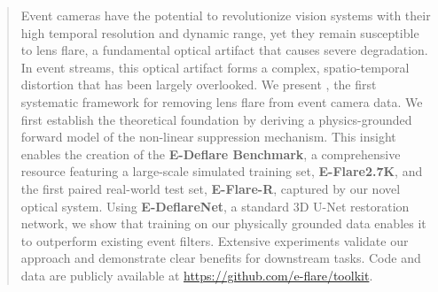 \begin{abstract}
Event cameras have the potential to revolutionize vision systems with their high temporal resolution and dynamic range, yet they remain susceptible to lens flare, a fundamental optical artifact that causes severe degradation. In event streams, this optical artifact forms a complex, spatio-temporal distortion that has been largely overlooked. We present \ours, the first systematic framework for removing lens flare from event camera data. We first establish the theoretical foundation by deriving a physics-grounded forward model of the non-linear suppression mechanism. This insight enables the creation of the \textbf{E-Deflare Benchmark}, a comprehensive resource featuring a large-scale simulated training set, \textbf{E-Flare2.7K}, and the first paired real-world test set, \textbf{E-Flare-R}, captured by our novel optical system. Using \textbf{E-DeflareNet}, a standard 3D U-Net restoration network, we show that training on our physically grounded data enables it to outperform existing event filters. Extensive experiments validate our approach and demonstrate clear benefits for downstream tasks. Code and data are publicly available at \mbox{\url{https://github.com/e-flare/toolkit}}.

\end{abstract}
